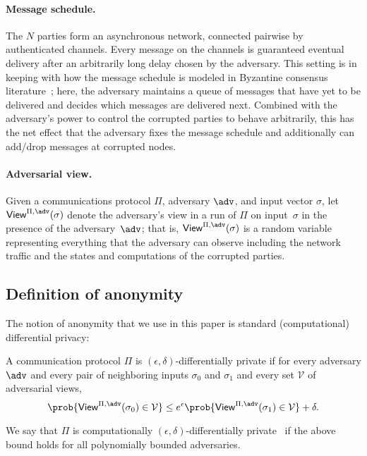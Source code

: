 \documentclass[runningheads,a4paper]{llncs}
\begin{document}
\paragraph{Message schedule.} 
The $N$ parties form an asynchronous network, connected pairwise by authenticated channels. Every message on the channels is guaranteed eventual delivery after an arbitrarily long delay chosen by the adversary. This setting is in keeping with how the message schedule is modeled in Byzantine consensus literature~\cite{bracha1984asynchronous, STOC:CanRab93}; here, the adversary maintains a queue of messages that have yet to be delivered and decides which messages are  delivered next. 
Combined with the adversary's power to control the corrupted parties to behave arbitrarily, this has the net effect that the adversary fixes the message schedule and additionally can add/drop messages at corrupted nodes. 

\paragraph{Adversarial view.}
Given a communications protocol $\Pi$, adversary $\adv$, and input vector $\sigma$, let $\mathsf{View}^{\Pi, \adv}(\sigma)$ denote the adversary's view in a run of $\Pi$ on input~$\sigma$ in the presence of the adversary~$\adv$; that is, $\mathsf{View}^{\Pi, \adv}(\sigma)$ is a random variable representing everything that the adversary can observe including the network traffic and the states and computations of the corrupted parties. 


\subsection{Definition of anonymity}
The notion of anonymity that we use in this paper is standard (computational) differential privacy: 
\begin{definition}  \label{def:dp}
A communication protocol $\Pi$ is $(\epsilon, \delta)$-differentially private if for every adversary $\adv$ and every pair of neighboring inputs $\sigma_0$ and $\sigma_1$ and every set $\mathcal{V}$ of adversarial views, 
\[
\prob{\mathsf{View}^{\Pi, \adv}(\sigma_0) \in \mathcal{V}} \le e^\epsilon \prob{\mathsf{View}^{\Pi, \adv}(\sigma_1) \in \mathcal{V}} + \delta .
\]
\end{definition} 

We say that $\Pi$ is computationally $(\epsilon,\delta)$-differentially private~\cite{C:MPRV09} if the above bound holds for all polynomially bounded adversaries.
\end{document}
